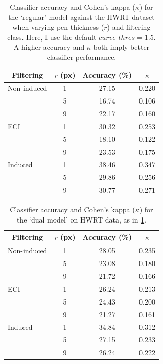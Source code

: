 \documentclass{mpaper}
\begin{document}
\begin{table}
\centering

\begin{tabular}{lccc}
\toprule
\multicolumn{1}{c}{Filtering} & $r$ (px) & Accuracy (\si{\percent}) & $\kappa$ \\
\midrule
Non-induced & 1 & 27.15 & 0.220 \\
& 5 & 16.74 & 0.106 \\
& 9 & 22.17 & 0.160 \\

ECI & 1 & 30.32 & 0.253 \\
& 5 & 18.10 & 0.122 \\
& 9 & 23.53 & 0.175 \\

Induced & 1 & 38.46 & 0.347 \\
& 5 & 29.86 & 0.256 \\
& 9 & 30.77 & 0.271 \\
\bottomrule
\end{tabular}

\vspace{0.5em}
\caption{
	Classifier accuracy and Cohen's kappa ($\kappa$) for the `regular' model against the HWRT dataset when varying pen-thickness ($r$) and filtering class.
	Here, I use the default $\mathit{curve\_thres}=1.5$.
	A higher accuracy and $\kappa$ both imply better classifier performance.%
	\label{tab:exp2-reg}
}
\end{table}

\begin{table}
	\centering
	
	\begin{tabular}{lccc}
		\toprule
		\multicolumn{1}{c}{Filtering} & $r$ (px) & Accuracy (\si{\percent}) & $\kappa$ \\
		\midrule
		Non-induced & 1 & 28.05 & 0.235 \\
		& 5 & 23.08 & 0.180 \\
		& 9 & 21.72 & 0.166 \\
		
		ECI & 1 & 26.24 & 0.213 \\
		& 5 & 24.43 & 0.200 \\
		& 9 & 21.27 & 0.161 \\
		
		Induced & 1 & 34.84 & 0.312 \\
		& 5 & 27.15 & 0.233 \\
		& 9 & 26.24 & 0.222 \\
		\bottomrule
	\end{tabular}
	
	\vspace{0.5em}
	\caption{
		Classifier accuracy and Cohen's kappa ($\kappa$) for the `dual model' on HWRT data, as in \cref{tab:exp2-reg}.
		\label{tab:exp2-dual}
	}
\end{table}
\end{document}
